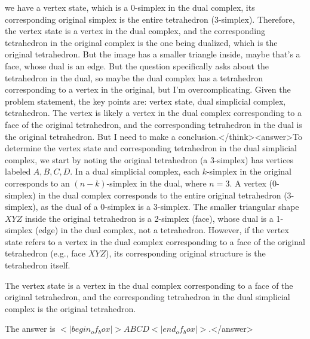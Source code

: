 we have a vertex state, which is a 0-simplex in the dual complex, its corresponding original simplex is the entire tetrahedron (3-simplex). Therefore, the vertex state is a vertex in the dual complex, and the corresponding tetrahedron in the original complex is the one being dualized, which is the original tetrahedron. But the image has a smaller triangle inside, maybe that's a face, whose dual is an edge. But the question specifically asks about the tetrahedron in the dual, so maybe the dual complex has a tetrahedron corresponding to a vertex in the original, but I'm overcomplicating. Given the problem statement, the key points are: vertex state, dual simplicial complex, tetrahedron. The vertex is likely a vertex in the dual complex corresponding to a face of the original tetrahedron, and the corresponding tetrahedron in the dual is the original tetrahedron. But I need to make a conclusion.</think><answer>To determine the vertex state and corresponding tetrahedron in the dual simplicial complex, we start by noting the original tetrahedron (a 3-simplex) has vertices labeled \(A, B, C, D\). In a dual simplicial complex, each \(k\)-simplex in the original corresponds to an \((n-k)\)-simplex in the dual, where \(n = 3\). A vertex (0-simplex) in the dual complex corresponds to the entire original tetrahedron (3-simplex), as the dual of a 0-simplex is a 3-simplex. The smaller triangular shape \(XYZ\) inside the original tetrahedron is a 2-simplex (face), whose dual is a 1-simplex (edge) in the dual complex, not a tetrahedron. However, if the vertex state refers to a vertex in the dual complex corresponding to a face of the original tetrahedron (e.g., face \(XYZ\)), its corresponding original structure is the tetrahedron itself.  

The vertex state is a vertex in the dual complex corresponding to a face of the original tetrahedron, and the corresponding tetrahedron in the dual simplicial complex is the original tetrahedron.  

The answer is \(<|begin_of_box|>ABCD<|end_of_box|>\).</answer>